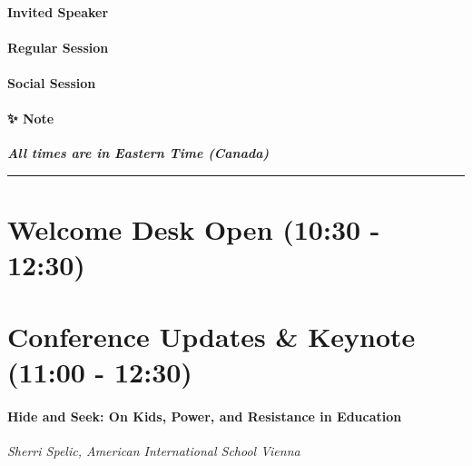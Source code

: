 \documentclass[
]{book}
\begin{document}
\begin{wp}
\hypertarget{invited-speaker}{%
\paragraph{Invited Speaker}\label{invited-speaker}}
\end{wp}

\begin{secondary}
\hypertarget{regular-session}{%
\paragraph{Regular Session}\label{regular-session}}
\end{secondary}
\begin{gh}
\hypertarget{social-session}{%
\paragraph{Social Session}\label{social-session}}
\end{gh}
\begin{protip}
\hypertarget{note}{%
\paragraph*{✨ Note}\label{note}}

\textbf{\emph{All times are in Eastern Time (Canada)}}
\end{protip}

\begin{center}\rule{0.5\linewidth}{0.5pt}\end{center}

\hypertarget{welcome-desk-open-1030---1230-1}{%
\section*{Welcome Desk Open (10:30 - 12:30)}\label{welcome-desk-open-1030---1230-1}}

\hypertarget{conference-updates-keynote-1100---1230}{%
\section*{Conference Updates \& Keynote (11:00 - 12:30)}\label{conference-updates-keynote-1100---1230}}

\begin{reflect}
\hypertarget{hide-and-seek-on-kids-power-and-resistance-in-education}{%
\paragraph{Hide and Seek: On Kids, Power, and Resistance in
Education}\label{hide-and-seek-on-kids-power-and-resistance-in-education}}

\emph{Sherri Spelic, American International School Vienna}
\end{reflect}
\end{document}
